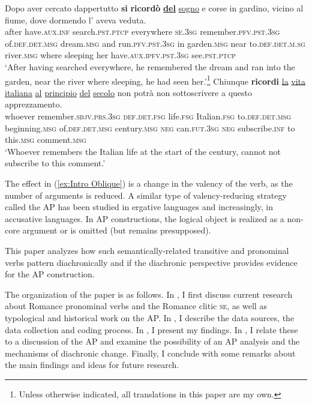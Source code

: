 \documentclass[output=paper,colorlinks,citecolor=brown]{langscibook}
\begin{document}
\begin{exe}
\ex \label{Intro Examples} \begin{xlist}
    \ex\label{ex:Intro Oblique}
    \gll Dopo aver cercato dappertutto \textbf{si} \textbf{ricordò} \ul{\textbf{del}} \ul{sogno} e corse in gardino, vicino al fiume, dove dormendo l' aveva veduta.\\
    after	have.\textsc{aux.inf}	search.\textsc{pst.ptcp}	everywhere \textsc{se}.\textsc{3sg} remember.\textsc{pfv.pst.3sg}		of.\textsc{def.det.msg}	dream.\textsc{msg}		and run.\textsc{pfv.pst.3sg} 	in	garden.\textsc{msg}	near	to.\textsc{def.det.m.sg}	river.\textsc{msg} where sleeping her have.\textsc{aux.ipfv.pst.3sg} see.\textsc{pst.ptcp}\\ 
    \glt ‘After having searched everywhere, he remembered the dream and ran into the garden, near the river where sleeping, he had seen her.'\footnote{Unless otherwise indicated, all translations in this paper are my own.}
    \ex\label{ex:Intro Direct}
    \gll Chiunque \textbf{ricordi} \ul{la} \ul{vita}	\ul{italiana} \ul{al}	\ul{principio} \ul{del}	\ul{secolo} non potrà non sottoscrivere a questo  apprezzamento.\\
    whoever	remember.\textsc{sbjv.prs.3sg} \textsc{def.det.fsg} life.\textsc{fsg} Italian.\textsc{fsg} to.\textsc{def.det.msg}	beginning.\textsc{msg} of.\textsc{def.det.msg} century.\textsc{msg} \textsc{neg} can.\textsc{fut.3sg} \textsc{neg}		subscribe.\textsc{inf} to this.\textsc{msg} comment.\textsc{msg}\\ 
    \glt ‘Whoever remembers the Italian life at the start of the century, cannot not subscribe to this comment.’
\end{xlist}
\end{exe}

The effect in (\ref{ex:Intro Oblique}) is a change in the valency of the verb, as the number of arguments is reduced. A similar type of valency-reducing strategy called the AP has been studied in ergative languages and increasingly, in accusative languages. In AP constructions, the logical object is realized as a non-core argument or is omitted (but remains presupposed).

This paper analyzes how such semantically-related transitive and pronominal verbs pattern diachronically and if the diachronic perspective provides evidence for the AP construction.

The organization of the paper is as follows. In , I first discuss current research about Romance pronominal verbs and the Romance clitic \textsc{se}, as well as typological and historical work on the AP. In , I describe the data sources, the data collection and coding process. In , I present my findings. In , I relate these to a discussion of the AP and examine the possibility of an AP analysis and the mechanisms of diachronic change. Finally, I conclude with some remarks about the main findings and ideas for future research.
\end{document}
